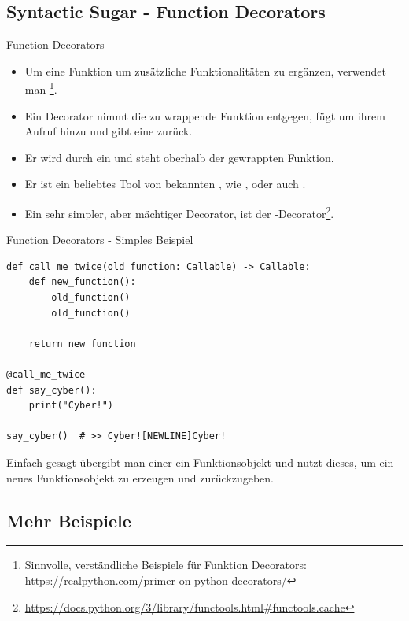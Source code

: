 \documentclass[12pt, aspectratio=169, usepdftitle=false]{beamer}
\newcommand{\pp}[1]{\lpl{#1}}
\newcommand{\furl}[1]{\footnote{\url{#1}}}
\begin{document}
\subsection{Syntactic Sugar - Function Decorators}
\begin{frame}{Function Decorators}
	\begin{itemize}
		\item Um eine Funktion um zusätzliche Funktionalitäten zu ergänzen, verwendet man \footnote{Sinnvolle, verständliche Beispiele für Funktion Decorators: \url{https://realpython.com/primer-on-python-decorators/}}.
		\pause
		
		\item Ein Decorator nimmt die zu wrappende Funktion entgegen, fügt um ihrem Aufruf  hinzu und gibt eine  zurück.
		\pause
		\item Er wird durch ein \pp{@}  und steht oberhalb der gewrappten Funktion.
		\pause
		\item Er ist ein beliebtes Tool von bekannten , wie ,  oder auch \pp{discord.py}. 
		\pause
		\item Ein sehr simpler, aber mächtiger Decorator, ist der \pp{@cache}-Decorator\furl{https://docs.python.org/3/library/functools.html\#functools.cache}.
	\end{itemize}
\end{frame}


\begin{frame}{Function Decorators - Simples Beispiel}
	\begin{lstlisting}[language=pytiny]
def call_me_twice(old_function: Callable) -> Callable:
    def new_function():
        old_function()
        old_function()

    return new_function

@call_me_twice
def say_cyber():
    print("Cyber!")

say_cyber()  # >> Cyber![NEWLINE]Cyber!
	\end{lstlisting}
	
	Einfach gesagt übergibt man einer  ein Funktionsobjekt
	und nutzt dieses, um ein neues Funktionsobjekt zu erzeugen und zurückzugeben.
	
\end{frame}

\subsection{Mehr Beispiele}
\end{document}
